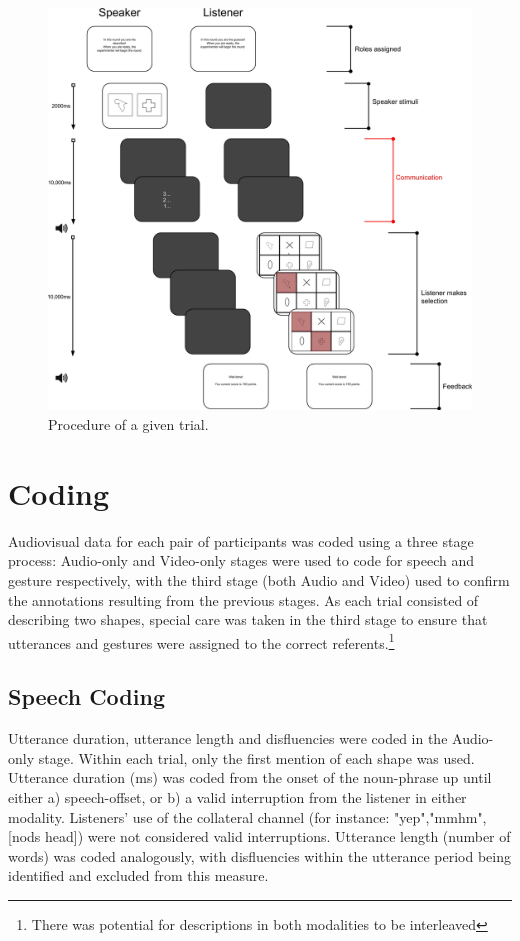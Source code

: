 \documentclass[a4paper,man,natbib]{apa6}
\begin{document}
\begin{figure}
  \centering
	\includegraphics[width=\linewidth]{trial.png}
  \caption{Procedure of a given trial.}
  \label{fig:trial}
\end{figure}

\section{Coding}
Audiovisual data for each pair of participants was coded using a three stage process:
Audio-only and Video-only stages were used to code for speech and gesture respectively, with the third stage (both Audio and Video) used to confirm the annotations resulting from the previous stages.
As each trial consisted of describing two shapes, special care was taken in the third stage to ensure that utterances and gestures were assigned to the correct referents.\footnote{There was potential for descriptions in both modalities to be interleaved}



\subsection{Speech Coding}
Utterance duration, utterance length and disfluencies were coded in the Audio-only stage.
Within each trial, only the first mention of each shape was used. 
Utterance duration (ms) was coded from the onset of the noun-phrase up until either a) speech-offset, or b) a valid interruption from the listener in either modality.
Listeners' use of the collateral channel (for instance: "yep","mmhm",[nods head]) were not considered valid interruptions.
Utterance length (number of words) was coded analogously, with disfluencies within the utterance period being identified and excluded from this measure.
\end{document}
